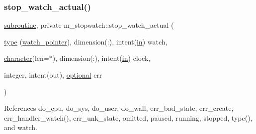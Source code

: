 \subsubsection{\texorpdfstring{stop\+\_\+watch\+\_\+actual()}{stop\_watch\_actual()}}
{\footnotesize\ttfamily \hyperlink{M__stopwatch_83_8txt_acfbcff50169d691ff02d4a123ed70482}{subroutine}, private m\+\_\+stopwatch\+::stop\+\_\+watch\+\_\+actual (\begin{DoxyParamCaption}\item[{\hyperlink{stop__watch_83_8txt_a70f0ead91c32e25323c03265aa302c1c}{type} (\hyperlink{structm__stopwatch_1_1watch__pointer}{watch\+\_\+pointer}), dimension(\+:), intent(\hyperlink{M__journal_83_8txt_afce72651d1eed785a2132bee863b2f38}{in})}]{watch,  }\item[{\hyperlink{option__stopwatch_83_8txt_abd4b21fbbd175834027b5224bfe97e66}{character}(len=$\ast$), dimension(\+:), intent(\hyperlink{M__journal_83_8txt_afce72651d1eed785a2132bee863b2f38}{in})}]{clock,  }\item[{integer, intent(out), \hyperlink{option__stopwatch_83_8txt_aa4ece75e7acf58a4843f70fe18c3ade5}{optional}}]{err }\end{DoxyParamCaption})\hspace{0.3cm}{\ttfamily [private]}}



References do\+\_\+cpu, do\+\_\+sys, do\+\_\+user, do\+\_\+wall, err\+\_\+bad\+\_\+state, err\+\_\+create, err\+\_\+handler\+\_\+watch(), err\+\_\+unk\+\_\+state, omitted, paused, running, stopped, type(), and watch.

\mbox{\label{namespacem__stopwatch_aa9adc6b0a3fa0ccf5c542000f0b7925c}} 
